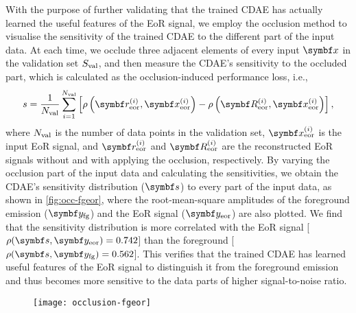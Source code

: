 With the purpose of further validating that the trained CDAE has actually
learned the useful features of the EoR signal, we employ the occlusion
method \cite{zeiler2014} to visualise the sensitivity of the trained CDAE
to the different part of the input data.
At each time, we occlude three adjacent elements of every input
$\B{x}$ in the validation set $S_{\mathrm{val}}$, and then measure the CDAE's
sensitivity to the occluded part, which is calculated as the
occlusion-induced performance loss, i.e.,
\begin{equation}
  \label{eq:perf-loss}
  s = \frac{1}{N_{\R{val}}} \sum_{i=1}^{N_{\R{val}}} \left[
      \rho\left(\B{r}^{(i)}_{\R{eor}}, \B{x}^{(i)}_{\R{eor}}\right) -
      \rho\left(\B{R}^{(i)}_{\R{eor}}, \B{x}^{(i)}_{\R{eor}}\right)
    \right] ,
\end{equation}
where
$N_{\mathrm{val}}$ is the number of data points in the validation set,
$\B{x}^{(i)}_{\R{eor}}$ is the input EoR signal, and
$\B{r}^{(i)}_{\R{eor}}$ and $\B{R}^{(i)}_{\R{eor}}$ are the reconstructed
EoR signals without and with applying the occlusion, respectively.
By varying the occlusion part of the input data and calculating the
sensitivities, we obtain the CDAE's sensitivity distribution ($\B{s}$) to
every part of the input data, as shown in \autoref{fig:occ-fgeor}, where
the root-mean-square amplitudes of the foreground emission
($\B{y}_{\R{fg}}$) and the EoR signal ($\B{y}_{\R{eor}}$) are also plotted.
We find that the sensitivity distribution is more correlated with the EoR
signal [$\rho(\B{s}, \B{y}_{\R{eor}}) = 0.742$] than the foreground
[$\rho(\B{s}, \B{y}_{\R{fg}}) = 0.562$].
This verifies that the trained CDAE has learned useful features of the EoR
signal to distinguish it from the foreground emission and thus becomes more
sensitive to the data parts of higher signal-to-noise ratio.

\begin{figure}[htp]
  \centering
  \texttt{[image: occlusion-fgeor]}
  \label{fig:occ-fgeor}
\end{figure}


